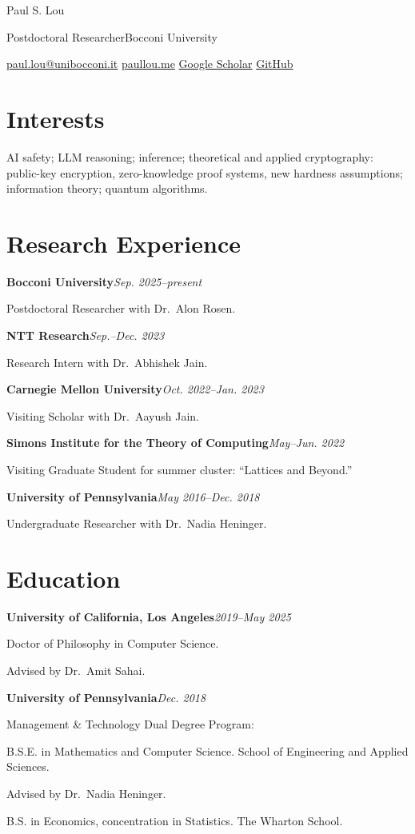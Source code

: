 \documentclass[11pt,a4paper]{article}
\newcommand{\role}[4]{%
  \Needspace{3\baselineskip}%
  \textbf{#1}\hfill{\small\itshape\color{Secondary}#3}\par
  {\small\color{Secondary} #2 #4\par}\vspace{6pt}}
\begin{document}
\fontsize{11}{13.2}\selectfont\color{Ink}

{\fontsize{28}{32}\selectfont\color{Accent}Paul S. Lou}\par
\vspace{3pt}
{\fontsize{11.5}{14}\selectfont Postdoctoral Researcher\enspace\textbar\enspace Bocconi University}\par
\vspace{5pt}
{\small
\href{mailto:paul.lou@unibocconi.it}{paul.lou@unibocconi.it}\enspace\textbar\enspace
\href{https://paullou.me/}{paullou.me}\enspace\textbar\enspace
\href{https://scholar.google.com/citations?user=RiHslnEAAAAJ}{Google Scholar}\enspace\textbar\enspace
\href{https://github.com/pslou}{GitHub}}
\par{}\vspace{1pt}

\section{Interests}
{\raggedright{} AI safety; LLM reasoning; inference; theoretical and applied cryptography: public-key encryption, zero-knowledge proof systems, new hardness assumptions; information theory; quantum algorithms.\par}

\section{Research Experience}
\role{Bocconi University}{Postdoctoral Researcher}{Sep. 2025--present}{with Dr.~Alon Rosen.}
\role{NTT Research}{Research Intern}{Sep.--Dec. 2023}{with Dr.~Abhishek Jain.}
\role{Carnegie Mellon University}{Visiting Scholar}{Oct. 2022--Jan. 2023}{with Dr.~Aayush Jain.}
\role{Simons Institute for the Theory of Computing}{Visiting Graduate Student}{May--Jun. 2022}{for summer cluster: ``Lattices and Beyond.''}
\role{University of Pennsylvania}{Undergraduate Researcher}{May 2016--Dec. 2018}{with Dr.~Nadia Heninger.}

\section{Education}
\textbf{University of California, Los Angeles}\hfill{\small\itshape\color{Secondary}2019--May 2025}\par
Doctor of Philosophy in Computer Science.\par
{\small\color{Secondary} Advised by Dr.~Amit Sahai.}\par\vspace{5pt}
\textbf{University of Pennsylvania}\hfill{\small\itshape\color{Secondary}Dec. 2018}\par
Management \& Technology Dual Degree Program:\par
B.S.E. in Mathematics and Computer Science. School of Engineering and Applied Sciences.\par
{\small\color{Secondary} Advised by Dr.~Nadia Heninger.}\par
B.S. in Economics, concentration in Statistics. The Wharton School.\par
\end{document}
